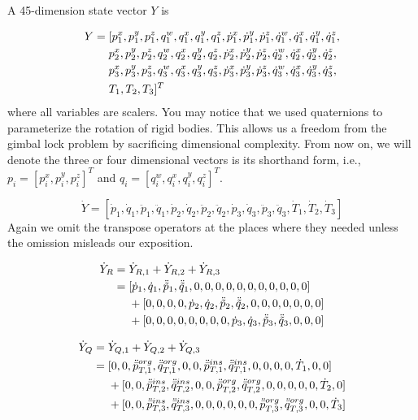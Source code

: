 \documentclass[a4paper,10pt]{article}
\begin{document}
A 45-dimension state vector $Y$ is

\begin{align}
Y = {} & [p_1^x, p_1^y, p_1^z, q_1^w, q_1^x, q_1^y, q_1^z, \dot{p}_1^x, \dot{p}_1^y, \dot{p}_1^z, \dot{q}_1^w, \dot{q}_1^x, \dot{q}_1^y, \dot{q}_1^z,\notag\\
       &  p_2^x, p_2^y, p_2^z, q_2^w, q_2^x, q_2^y, q_2^z, \dot{p}_2^x, \dot{p}_2^y, \dot{p}_2^z, \dot{q}_2^w, \dot{q}_2^x, \dot{q}_2^y, \dot{q}_2^z,\notag\\
       &  p_3^x, p_3^y, p_3^z, q_3^w, q_3^x, q_3^y, q_3^z, \dot{p}_3^x, \dot{p}_3^y, \dot{p}_3^z, \dot{q}_3^w, \dot{q}_3^x, \dot{q}_3^y, \dot{q}_3^z,\notag\\
       & T_1, T_2, T_3]^T\label{StateVector}
\end{align}
where all variables are scalers. You may notice that we used quaternions
to parameterize the rotation of rigid bodies. This allows us a freedom
from the gimbal lock problem by sacrificing dimensional complexity. From
now on, we will denote the three or four dimensional vectors is its shorthand
form, i.e., $p_i=[p_i^x, p_i^y, p_i^z]^T$ and $q_i=[q_i^w, q_i^x, q_i^y, q_i^z]^T$.

\begin{equation}\label{StateVectorDerivative}
\dot{Y}  =  [\dot{p}_1, \dot{q}_1, \ddot{p}_1, \ddot{q}_1,
               \dot{p}_2, \dot{q}_2, \ddot{p}_2, \ddot{q}_2,
               \dot{p}_3, \dot{q}_3, \ddot{p}_3, \ddot{q}_3,
               \dot{T}_1, \dot{T}_2, \dot{T}_3]
\end{equation}
Again we omit the transpose operators at the places where they needed
unless the omission misleads our exposition.


\begin{align}
\dot{Y}_R = {} & \dot{Y}_{R,1} + \dot{Y}_{R,2} + \dot{Y}_{R,3}\\
          = {} &  [   \dot{p}_1, \dot{q}_1, \ddot{\tilde{p}}_1, \ddot{\tilde{q}}_1, 0, 0, 0, 0, 0, 0, 0, 0, 0, 0, 0 ]\notag\\
               & + [ 0, 0, 0, 0, \dot{p}_2, \dot{q}_2, \ddot{\tilde{p}}_2, \ddot{\tilde{q}}_2, 0, 0, 0, 0, 0, 0, 0 ]\notag\\
               & + [ 0, 0, 0, 0, 0, 0, 0, 0, \dot{p}_3, \dot{q}_3, \ddot{\tilde{p}}_3, \ddot{\tilde{q}}_3, 0, 0, 0 ]\notag
\end{align}


\begin{align}
\dot{Y}_Q = {} & \dot{Y}_{Q,1} + \dot{Y}_{Q,2} + \dot{Y}_{Q,3}\\
          = {} &   [ 0, 0, \ddot{\bar{p}}_{T,1}^{org}, \ddot{\bar{q}}_{T,1}^{org}, 0, 0, \ddot{\bar{p}}_{T,1}^{ins}, \ddot{\bar{q}}_{T,1}^{ins}, 0, 0, 0, 0, \dot{T}_1, 0, 0 ]\notag\\
               & + [ 0, 0, \ddot{\bar{p}}_{T,2}^{ins}, \ddot{\bar{q}}_{T,2}^{ins}, 0, 0, \ddot{\bar{p}}_{T,2}^{org}, \ddot{\bar{q}}_{T,2}^{org}, 0, 0, 0, 0, 0, \dot{T}_2, 0 ]\notag\\
               & + [ 0, 0, \ddot{\bar{p}}_{T,3}^{ins}, \ddot{\bar{q}}_{T,3}^{ins}, 0, 0, 0, 0, 0, 0, \ddot{\bar{p}}_{T,3}^{org}, \ddot{\bar{q}}_{T,3}^{org}, 0, 0, \dot{T}_3 ]\notag
\end{align}
\end{document}
